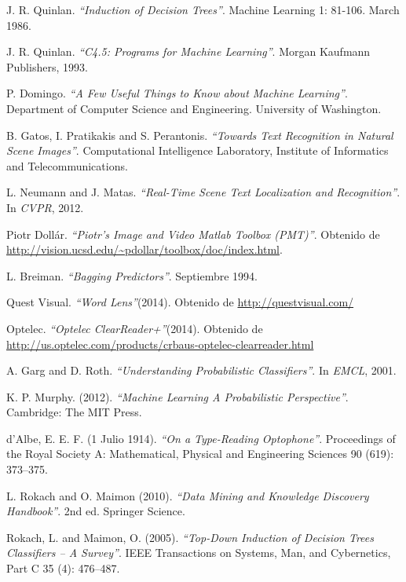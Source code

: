 \begin{thebibliography}{100}
		J. R. Quinlan.
		\emph{``Induction of Decision Trees''}.
		Machine Learning 1: 81-106.
		March 1986.
		
		J. R. Quinlan.
		\emph{``C4.5: Programs for Machine Learning''}.
		Morgan Kaufmann Publishers, 1993.
		
		P. Domingo.
		\emph{``A Few Useful Things to Know about Machine Learning''}.
		Department of Computer Science and Engineering.
		University of Washington.
		
		B. Gatos, I. Pratikakis and S. Perantonis.
		\emph{``Towards Text Recognition in Natural Scene Images''}.
		Computational Intelligence Laboratory, Institute of Informatics and Telecommunications.
		
		L. Neumann and J. Matas.
		\emph{``Real-Time Scene Text Localization and Recognition''}.
		In \textit{CVPR}, 2012.
		
		Piotr Dollár.
		\emph{``Piotr's Image and Video Matlab Toolbox (PMT)''}.
		Obtenido de \url{http://vision.ucsd.edu/~pdollar/toolbox/doc/index.html}. 
		
		L. Breiman.
		\emph{``Bagging Predictors''}.
		Septiembre 1994.
		
		Quest Visual.
		\emph{``Word Lens''}(2014).
		Obtenido de \url{http://questvisual.com/}

		Optelec.
		\emph{``Optelec ClearReader+''}(2014).
		Obtenido de \url{http://us.optelec.com/products/crbaus-optelec-clearreader.html}	
		
		A. Garg and D. Roth.
		\emph{``Understanding Probabilistic Classifiers''}.
		In \textit{EMCL}, 2001.
		
		K. P. Murphy. (2012).
		\emph{``Machine Learning A Probabilistic Perspective''}.
		Cambridge: The MIT Press.
		
		d'Albe, E. E. F. (1 Julio 1914).
		\emph{``On a Type-Reading Optophone''}.
		Proceedings of the Royal Society A: Mathematical, Physical and Engineering Sciences 90 (619): 373–375.
		
		L. Rokach and O. Maimon (2010).
		\emph{``Data Mining and Knowledge Discovery Handbook''}.
		2nd ed. Springer Science.
		
		Rokach, L. and Maimon, O. (2005).
		\emph{``Top-Down Induction of Decision Trees Classifiers –
A Survey''}.
 		IEEE Transactions on Systems, Man, and Cybernetics, Part C 35 (4): 476–487. 
				
\end{thebibliography}
